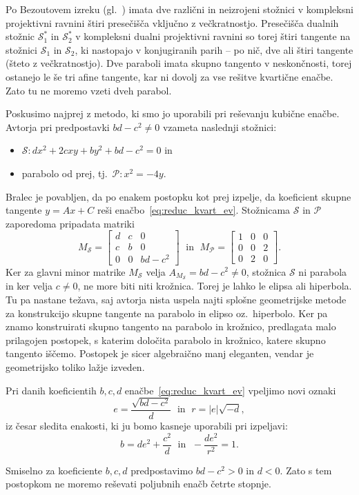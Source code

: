 Po Bezoutovem izreku (gl.\ \cite[izrek 2.4]{terglav2022}) imata dve različni in neizrojeni stožnici v kompleksni projektivni ravnini štiri presečišča vključno z večkratnostjo. Presečišča dualnih stožnic $\mathcal{S}^*_1$ in $\mathcal{S}^*_2$ v kompleksni dualni projektivni ravnini so torej štiri tangente na stožnici $\mathcal{S}_1$ in $\mathcal{S}_2$, ki nastopajo v konjugiranih parih -- po nič, dve ali štiri tangente (šteto z večkratnostjo). Dve paraboli imata skupno tangento v neskončnosti, torej ostanejo le še tri afine tangente, kar ni dovolj za vse rešitve kvartične enačbe. Zato tu ne moremo vzeti dveh parabol.

Poskusimo najprej z metodo, ki smo jo uporabili pri reševanju kubične enačbe. Avtorja pri predpostavki $bd - c^2 \neq 0$ vzameta naslednji stožnici:
\begin{itemize}
    \item $\mathcal{S}: dx^2 + 2cxy + by^2 + bd - c^2 = 0$ in
    \item parabolo od prej, tj.\ $\mathcal{P}: x^2 = -4y$.
\end{itemize}
Bralec je povabljen, da po enakem postopku kot prej izpelje, da koeficient skupne tangente $y = Ax + C$ reši enačbo~\ref{eq:reduc_kvart_ev}. Stožnicama $\mathcal{S}$ in $\mathcal{P}$ zaporedoma pripadata matriki
$$ M_\mathcal{S} =
    \begin{bmatrix}
        d & c & 0\\
        c & b & 0\\
        0 & 0 & bd - c^2
    \end{bmatrix}
    \; \text{ in } \; M_\mathcal{P} =
    \begin{bmatrix}
        1 & 0 & 0\\
        0 & 0 & 2\\
        0 & 2 & 0
    \end{bmatrix}.
$$
Ker za glavni minor matrike $M_\mathcal{S}$ velja $A_{M_\mathcal{S}} = bd - c^2 \neq 0$, stožnica $\mathcal{S}$ ni parabola in ker velja $c \neq 0$, ne more biti niti krožnica. Torej je lahko le elipsa ali hiperbola. Tu pa nastane težava, saj avtorja nista uspela najti splošne geometrijske metode za konstrukcijo skupne tangente na parabolo in elipso oz.\ hiperbolo. Ker pa znamo konstruirati skupno tangento na parabolo in krožnico, predlagata malo prilagojen postopek, s katerim določita parabolo in krožnico, katere skupno tangento iščemo. Postopek je sicer algebraično manj eleganten, vendar je geometrijsko toliko lažje izveden.

Pri danih koeficientih $b, c, d$ enačbe~\ref{eq:reduc_kvart_ev} vpeljimo novi oznaki
$$ e = \frac{\sqrt{bd - c^2}}{d} \; \text{ in } \; r = |e|\sqrt{-d}, $$
iz česar sledita enakosti, ki ju bomo kasneje uporabili pri izpeljavi:
\begin{equation}
    \label{eq:kvarticni_enakosti}
    b= de^2 + \frac{c^2}{d} \; \text{ in } \; -\frac{de^2}{r^2} = 1.
\end{equation}
\begin{opomba}
    Smiselno za koeficiente $b, c, d$ predpostavimo $bd - c^2 > 0$ in $d < 0$. Zato s tem postopkom ne moremo reševati poljubnih enačb četrte stopnje.
\end{opomba}

